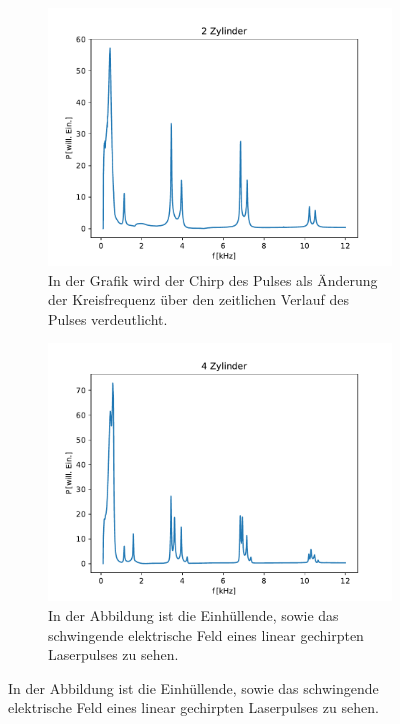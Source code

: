 \begin{figure}[ht]
\begin{subfigure}[b]{0.45\textwidth}
                    \includegraphics[scale=0.45]{./pictures/1dim_2_Zylinder_13mm.pdf}
                    \caption{In der Grafik wird der Chirp des Pulses als Änderung der Kreisfrequenz über den zeitlichen Verlauf des Pulses verdeutlicht.}
                    \label{fig:1dim_2_Zylinder_13mm}
                \end{subfigure}
                \centering
                \begin{subfigure}[b]{0.45\textwidth}
                    \centering
                    \includegraphics[scale=0.45]{./pictures/1dim_4_Zylinder_10mm.pdf}
                    \caption{In der Abbildung ist die Einhüllende, sowie das schwingende elektrische Feld eines linear gechirpten Laserpulses zu sehen.}

\end{subfigure}
\end{figure}
